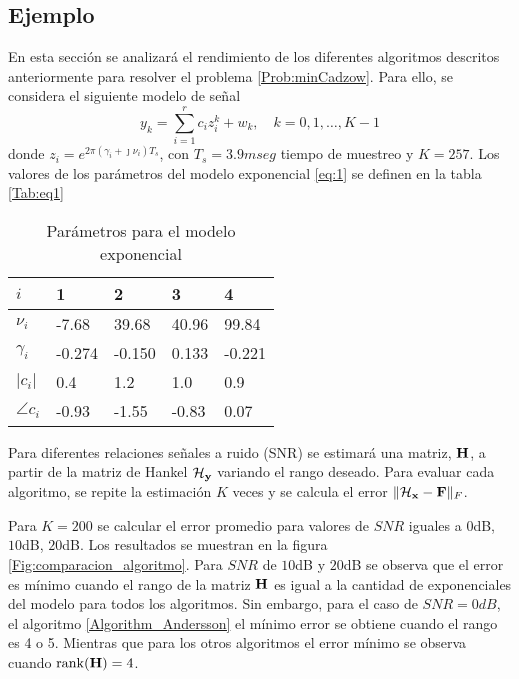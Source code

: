	\subsection{Ejemplo}
		En esta sección se analizará el rendimiento de los diferentes algoritmos descritos anteriormente para resolver el problema \eqref{Prob:minCadzow}. Para ello, se considera el siguiente modelo  de señal
		\begin{equation}
			y_k = \sum_{i=1}^{r}c_iz_i^k + w_k, \quad k = 0,1,\ldots, K-1
			\label{eq:1}
		\end{equation}
		donde $z_i = e^{2\pi(\gamma_i+\jmath\nu_i)T_s}$, con $T_s = 3.9mseg$ tiempo de muestreo y $K = 257$. Los valores de los parámetros del modelo exponencial \eqref{eq:1} se definen en la tabla \eqref{Tab:eq1}
	\begin{table}[t]
		\centering
		\begin{tabular}{lllll}
			$i$          & 1      & 2      & 3     & 4      \\ \hline 
			$\nu_i$      & -7.68  & 39.68  & 40.96 & 99.84  \\ 
			$\gamma_i$   & -0.274 & -0.150 & 0.133 & -0.221 \\ 
			$|c_i|$      & 0.4    & 1.2    & 1.0   & 0.9    \\ 
			$\angle c_i$ & -0.93  & -1.55  & -0.83 & 0.07   \\ 
			\hline
		\end{tabular}
	\caption{Parámetros para el modelo exponencial}
	\label{Tab:eq1}
	\end{table}

	Para diferentes relaciones señales a ruido (SNR) se estimará una matriz, $\mathbf{H}$, a partir de la matriz de Hankel $\mathcal{H}_{\mathbf{y}}$ variando el rango deseado. Para evaluar cada algoritmo, se repite la estimación $K$ veces y se calcula el error $\|\mathcal{H}_{\mathbf{x}}-\mathbf{F}\|_F$. 
	
	Para $K=200$ se calcular el error promedio para valores de $SNR$ iguales a $0$dB, $10$dB, $20$dB. Los resultados se muestran en la figura \ref{Fig:comparacion_algoritmo}. Para $SNR$ de $10$dB y $20$dB se observa que el error es mínimo cuando el rango de la matriz $\mathbf{H}$ es igual a la cantidad de exponenciales del modelo para todos los algoritmos. Sin embargo, para el caso de $SNR=0dB$,  el algoritmo \eqref{Algorithm_Andersson} el mínimo error se obtiene cuando el rango es 4 o 5. Mientras que para los otros algoritmos el error mínimo se observa cuando $\mathrm{rank}(\mathbf{H})=4$.



